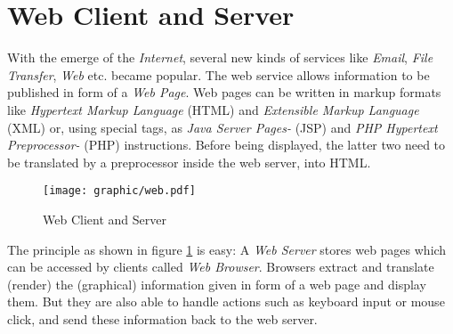 %
%
%
%
%
%
%

\section{Web Client and Server}
\label{web_client_and_server_heading}

With the emerge of the \emph{Internet}, several new kinds of services like
\emph{Email}, \emph{File Transfer}, \emph{Web} etc. became popular. The web
service allows information to be published in form of a \emph{Web Page}. Web
pages can be written in markup formats like \emph{Hypertext Markup Language}
(HTML) and \emph{Extensible Markup Language} (XML) or, using special tags, as
\emph{Java Server Pages-} (JSP) and \emph{PHP Hypertext Preprocessor-} (PHP)
instructions. Before being displayed, the latter two need to be translated by a
preprocessor inside the web server, into HTML.

\begin{figure}[ht]
    \begin{center}
        \texttt{[image: graphic/web.pdf]}
        \caption{Web Client and Server}
        \label{web_figure}
    \end{center}
\end{figure}

The principle as shown in figure \ref{web_figure} is easy: A \emph{Web Server}
stores web pages which can be accessed by clients called \emph{Web Browser}.
Browsers extract and translate (render) the (graphical) information given in
form of a web page and display them. But they are also able to handle actions
such as keyboard input or mouse click, and send these information back to the
web server.

